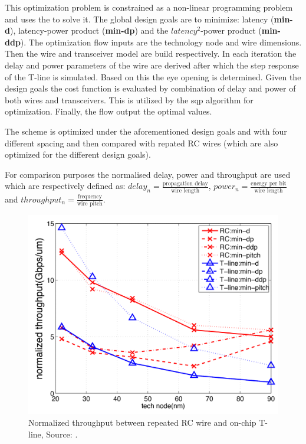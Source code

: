 This optimization problem is constrained as a non-linear programming problem and uses the  to solve it.
The global design goals are to minimize: latency (\textbf{min-d}), latency-power product (\textbf{min-dp}) and the $latency^{2}$-power product (\textbf{min-ddp}).
The optimization flow inputs are the technology node and wire dimensions.
Then the wire and transceiver model are build respectively.
In each iteration the delay and power parameters of the wire are derived after which the step response of the T-line is simulated.
Based on this the eye opening is determined.
Given the design goals the cost function is evaluated by combination of delay and power of both wires and transceivers.
This is utilized by the \ac{sqp} algorithm for optimization.
Finally, the flow output the optimal values.

The scheme is optimized under the aforementioned design goals and with four different spacing and then compared with repated RC wires (which are also optimized for the different design goals).

For comparison purposes the normalised delay, power and throughput are used which are respectively defined as: $delay_{n} = \frac{\text{propagation delay}}{\text{wire length}}$, $power_{n} = \frac{\text{energy per bit}}{\text{wire length}}$ and $throughput_{n} = \frac{\text{frequency}}{\text{wire pitch}}$.

\begin{figure}
	\centering
	\includegraphics[width=0.95\linewidth]{Figures/Rep3NormThrough.png}
	\caption{Normalized throughput between repeated RC wire and on-chip T-line, Source: \cite{zhang2009high}.} 
    \label{fig:rep3:normthrough}
\end{figure}

